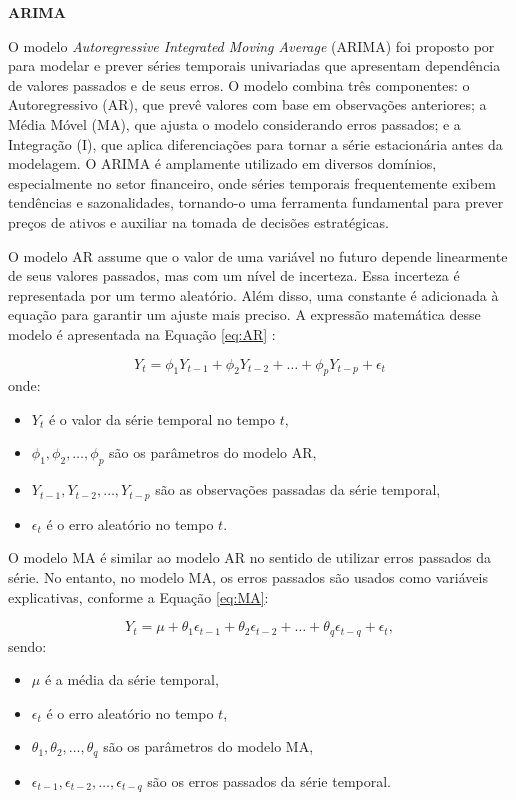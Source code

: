 \textbf{ARIMA}

O modelo \textit{Autoregressive Integrated Moving Average} (ARIMA) foi proposto por \cite{box1976} para modelar e prever séries temporais univariadas que apresentam dependência de valores passados e de seus erros. O modelo combina três componentes: o Autoregressivo (AR), que prevê valores com base em observações anteriores; a Média Móvel (MA), que ajusta o modelo considerando erros passados; e a Integração (I), que aplica diferenciações para tornar a série estacionária antes da modelagem. O ARIMA é amplamente utilizado em diversos domínios, especialmente no setor financeiro, onde séries temporais frequentemente exibem tendências e sazonalidades, tornando-o uma ferramenta fundamental para prever preços de ativos e auxiliar na tomada de decisões estratégicas.

O modelo AR assume que o valor de uma variável no futuro depende linearmente de seus valores passados, mas com um nível de incerteza. Essa incerteza é representada por um termo aleatório. Além disso, uma constante é adicionada à equação para garantir um ajuste mais preciso. A expressão matemática desse modelo é apresentada na Equação \eqref{eq:AR} \citep{ratnadip2013, box1976}:

\begin{equation}
Y_t = \phi_1 Y_{t-1} + \phi_2 Y_{t-2} + \dots + \phi_p Y_{t-p} + \epsilon_t
\label{eq:AR}
\end{equation}
onde:

\begin{itemize}
    \item \( Y_t \) é o valor da série temporal no tempo \( t \),
    \item \( \phi_1, \phi_2, \dots, \phi_p \) são os parâmetros do modelo AR,
    \item \( Y_{t-1}, Y_{t-2}, \dots, Y_{t-p} \) são as observações passadas da série temporal,
    \item \( \epsilon_t \) é o erro aleatório no tempo \( t \).
\end{itemize}

O modelo MA é similar ao modelo AR no sentido de utilizar erros passados da série. No entanto, no modelo MA, os erros passados são usados como variáveis explicativas, conforme a Equação \eqref{eq:MA}:

\begin{equation}
Y_t = \mu + \theta_1 \epsilon_{t-1} + \theta_2 \epsilon_{t-2} + \dots + \theta_q \epsilon_{t-q}+ \epsilon_{t},
\label{eq:MA}
\end{equation}
sendo:
\begin{itemize}
    \item \( \mu \) é a média da série temporal,
    \item \( \epsilon_t \) é o erro aleatório no tempo \( t \),
    \item \( \theta_1, \theta_2, \dots, \theta_q \) são os parâmetros do modelo MA,
    \item \( \epsilon_{t-1}, \epsilon_{t-2}, \dots, \epsilon_{t-q} \) são os erros passados da série temporal.
\end{itemize}


